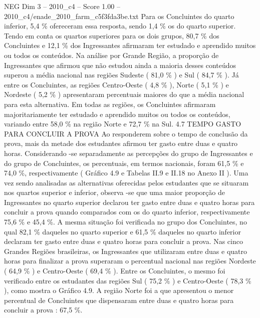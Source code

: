 \begin{textsample}{NEG Dim 3 – 2010\_c4 – Score 1.00 – 2010\_c4/enade\_2010\_farm\_c5f3fda3be.txt}
Para os Concluintes do quarto inferior, 5,4 \% ofereceram essa resposta, sendo 1,4 \% os do quarto superior.
Tendo em conta os quartos superiores para os dois grupos, 80,7 \% dos Concluintes e 12,1 \% dos Ingressantes afirmaram ter estudado e aprendido muitos ou todos os conteúdos.
Na análise por Grande Região, a proporção de Ingressantes que afirmou que não estudou ainda a maioria desses conteúdos superou a média nacional nas regiões Sudeste ( 81,0 \% ) e Sul ( 84,7 \% ).
Já entre os Concluintes, as regiões Centro-Oeste ( 4,8 \% ), Norte ( 5,1 \% ) e Nordeste ( 5,2 \% ) apresentaram percentuais maiores do que a média nacional para esta alternativa.
Em todas as regiões, os Concluintes afirmaram majoritariamente ter estudado e aprendido muitos ou todos os conteúdos, variando entre 58,0 \% na região Norte e 72,7 \% na Sul. 4.7 TEMPO GASTO PARA CONCLUIR A PROVA Ao responderem sobre o tempo de conclusão da prova, mais da metade dos estudantes afirmou ter gasto entre duas e quatro horas.
Considerando -se separadamente as percepções do grupo de Ingressantes e do grupo de Concluintes, os percentuais, em termos nacionais, foram 61,5 \% e 74,0 \%, respectivamente ( Gráfico 4.9 e Tabelas II.9 e II.18 no Anexo II ).
Uma vez sendo analisadas as alternativas oferecidas pelos estudantes que se situaram nos quartos superior e inferior, observa -se que uma maior proporção de Ingressantes no quarto superior declarou ter gasto entre duas e quatro horas para concluir a prova quando comparados com os do quarto inferior, respectivamente 75,6 \% e 45,4 \%.
A mesma situação foi verificada no grupo dos Concluintes, no qual 82,1 \% daqueles no quarto superior e 61,5 \% daqueles no quarto inferior declaram ter gasto entre duas e quatro horas para concluir a prova.
Nas cinco Grandes Regiões brasileiras, os Ingressantes que utilizaram entre duas e quatro horas para finalizar a prova superaram o percentual nacional nas regiões Nordeste ( 64,9 \% ) e Centro-Oeste ( 69,4 \% ).
Entre os Concluintes, o mesmo foi verificado entre os estudantes das regiões Sul ( 75,2 \% ) e Centro-Oeste ( 78,3 \% ), como mostra o Gráfico 4.9.
A região Norte foi a que apresentou o menor percentual de Concluintes que dispensaram entre duas e quatro horas para concluir a prova : 67,5 \%.

\end{textsample}
